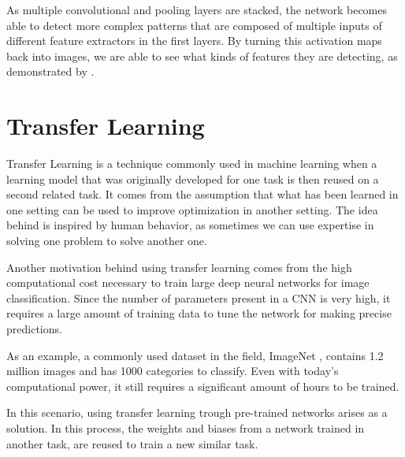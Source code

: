 
As multiple convolutional and pooling layers are stacked, the network becomes able to detect more complex patterns that are composed of multiple inputs of different feature extractors in the first layers. By turning this activation maps back into images, we are able to see what kinds of features they are detecting, as demonstrated by \citep{ZeilerF14}.



\section{Transfer Learning}

Transfer Learning is a technique commonly used in machine learning when a learning model that was originally developed for one task is then reused on a second related task. It comes from the assumption that what has been learned in one setting can be used to improve optimization in another setting. The idea behind is inspired by human behavior, as sometimes we can use expertise in solving one problem to solve another one.

Another motivation behind using transfer learning comes from the high computational cost necessary to train large deep neural networks for image classification. Since the number of parameters present in a CNN is very high, it requires a large amount of training data to tune the network for making precise predictions.

As an example, a commonly used dataset in the field, ImageNet \citep{DengDSLL009}, contains 1.2 million images and has 1000 categories to classify. Even with today's computational power, it still requires a significant amount of hours to be trained.

In this scenario, using transfer learning trough pre-trained networks arises as a solution. In this process, the weights and biases from a network trained in another task, are reused to train a new similar task.

